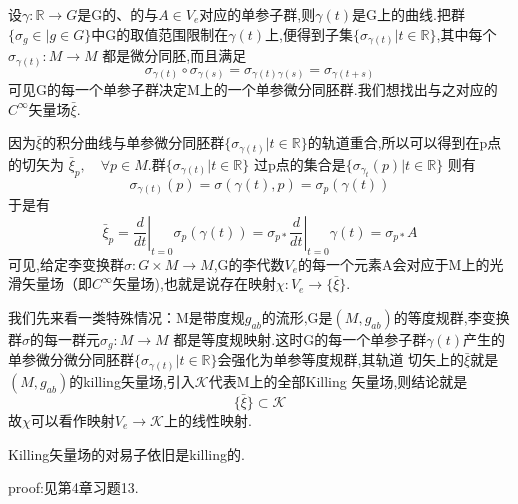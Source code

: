 \documentclass[../main.tex]{subfiles}
\begin{document}
设$\gamma:\mathbb{R}\longrightarrow G$是G的、的与$A\in V_e$对应的单参子群,则$\gamma(t)$是G上的曲线.把群$\{\sigma_g \in |g\in G\}$中G的取值范围限制在$\gamma(t)$上,便得到子集$\{\sigma_{\gamma(t)}|t\in \mathbb{R}\}$,其中每个$\sigma_{\gamma(t)}: M\rightarrow M$
都是微分同胚,而且满足\[
	\sigma_{\gamma(t)}\circ \sigma_{\gamma(s)} = \sigma_{\gamma(t)\gamma(s)} = \sigma_{\gamma(t+s)}
\]可见G的每一个单参子群决定M上的一个单参微分同胚群.我们想找出与之对应的$C^\infty$矢量场$\bar{\xi}$.

因为$\bar{\xi}$的积分曲线与单参微分同胚群$\{\sigma_{\gamma(t)}| t \in \mathbb{R}\}$的轨道重合,所以可以得到在p点的切矢为
$\bar{\xi}_p,\quad \forall p \in M$.群$\{\sigma_{\gamma(t)}|t \in \mathbb{R}\}$ 过p点的集合是$\{\sigma_{\gamma_t}(p)|t\in \mathbb{R}\}$
则有\[
	\sigma_{\gamma(t)}(p) = \sigma(\gamma(t),p) = \sigma_p(\gamma(t))
\]于是有
\begin{equation}
	\bar{\xi}_p = \left.\dfrac{d}{dt}\right|_{t = 0} \sigma_p(\gamma(t)) = \sigma_{p*}\left.\dfrac{d}{dt}\right|_{t = 0} \gamma(t) = \sigma_{p*}A
      \label{eq:G-7-1}
\end{equation}
可见,给定李变换群$\sigma: G\times M\rightarrow M $,G的李代数$V_e$的每一个元素A会对应于M上的光滑矢量场（即$C^\infty$矢量场),也就是说存在映射$\chi:V_e \rightarrow \{\bar{\xi}\}$.

我们先来看一类特殊情况：M是带度规$g_{ab}$的流形,G是$(M,g_{ab})$的等度规群,李变换群$\sigma$的每一群元$\sigma_g : M\rightarrow M $
都是等度规映射.这时G的每一个单参子群$\gamma(t)$产生的单参微分微分同胚群$\{\sigma_{\gamma(t)}|t\in \mathbb{R}\}$会强化为单参等度规群,其轨道
切矢上的$\bar{\xi}$就是$(M,g_{ab})$的killing矢量场,引入$\mathscr{K}$代表M上的全部Killing
矢量场,则结论就是$$
	\{\bar{\xi}\} \subset \mathscr{K}$$
故$\chi$可以看作映射$V_e \rightarrow \mathscr{K}$上的线性映射.
\begin{lemma}
	Killing矢量场的对易子依旧是killing的.
\end{lemma}
proof:见第4章习题13.
\end{document}
